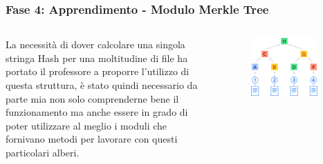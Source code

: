 \documentclass{beamer}
\begin{document}
\begin{frame}
	\frametitle{Fase 4: Apprendimento - Modulo Merkle Tree}
	\begin{columns}
		La necessità di dover calcolare una singola stringa Hash per una moltitudine di file ha portato il professore a proporre l’utilizzo di questa struttura, è stato quindi necessario da parte mia non solo comprenderne bene il funzionamento ma anche essere in grado di poter utilizzare al meglio i moduli che fornivano metodi per lavorare con questi particolari alberi.
		\begin{figure}
			\includegraphics[width=0.88\textwidth]{figures/merkle-tree.jpg}
		\end{figure}
	\end{columns}
\end{frame}
\end{document}
